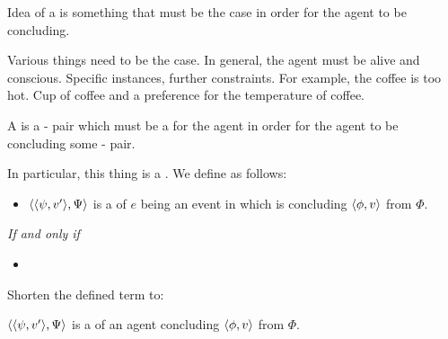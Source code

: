 \begin{note}
  Idea of a \requ{} is something that must be the case in order for the agent to be concluding.

  Various things need to be the case.
  In general, the agent must be alive and conscious.
  Specific instances, further constraints.
  For example, the coffee is too hot.
  Cup of coffee and a preference for the temperature of coffee.

  A  is a - pair which must be a  for the agent in order for the agent to be concluding some - pair.

  In particular, this thing is a \fc{}.
  We define  as follows:

  \begin{definition}[A \requ{0}]%
    \label{def:requ}%
    \vspace{-\baselineskip}
    \begin{itemize}
    \item
      \(\langle \langle \psi, v' \rangle, \Psi \rangle\) is a \emph{\requ{}} of \(e\) being an event in which \vAgent{} is concluding \(\langle \phi, v \rangle\) from \(\Phi\).
    \end{itemize}

    \emph{If and only if}

    \begin{itemize}
    \item
    \end{itemize}
    \vspace{-\baselineskip}
  \end{definition}

  \noindent%
  Shorten the defined term to:
  \begin{notationList}
  \item
    \(\langle \langle \psi, v' \rangle, \Psi \rangle\) is a \requ{} of an agent concluding \(\langle \phi, v \rangle\) from \(\Phi\).
  \end{notationList}
\end{note}


